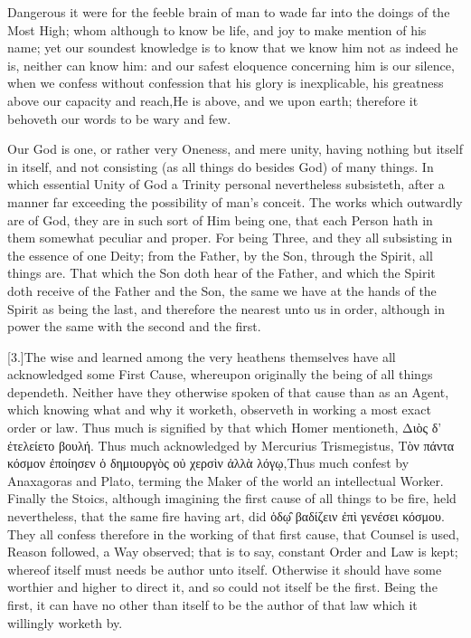 Dangerous it were for the feeble brain of man to wade far into the doings of the Most High; whom although to know be life, and joy to make mention of his name; yet our soundest knowledge is to know that we know him not as indeed he is, neither can know him: and our safest eloquence concerning him is our silence, when we confess without confession that his glory is inexplicable, his greatness above our capacity and reach,He is above, and we upon earth; therefore it behoveth our words to be wary and few.

Our God is one, or rather very Oneness, and mere unity, having nothing but itself in itself, and not consisting (as all things do besides God) of many things. In which essential Unity of God a Trinity personal nevertheless subsisteth, after a manner far exceeding the possibility of man’s conceit. The works which outwardly are of God, they are in such sort of Him being one, that each Person hath in them somewhat peculiar and proper. For being Three, and they all subsisting in the essence of one Deity; from the Father, by the Son, through the Spirit, all things are. That which the Son doth hear of the Father, and which the Spirit doth receive of the Father and the Son, the same we have at the hands of the Spirit as being the last, and therefore the nearest unto us in order, although in power the same with the second and the first.

[3.]The wise and learned among the very heathens themselves have all acknowledged some First Cause, whereupon originally the being of all things dependeth. Neither have they otherwise spoken of that cause than as an Agent, which knowing what and why it worketh, observeth in working a most exact order or law. Thus much is signified by that which Homer mentioneth, Διὸς δ’ ἐτελείετο βουλή. Thus  much acknowledged by Mercurius Trismegistus, Τὸν πάντα κόσμον ἐποίησεν ὁ δημιουργὸς οὐ χερσὶν ἀλλὰ λόγῳ,Thus much confest by Anaxagoras and Plato, terming the Maker of the world an intellectual Worker. Finally the Stoics, although imagining the first cause of all things to be fire, held nevertheless, that the same fire having art, did ὁδῳ̑ βαδίζειν ἐπὶ γενέσει κόσμου. They all confess therefore in the working of that first cause, that Counsel is used, Reason followed, a Way observed; that is to say, constant Order and Law is kept; whereof itself must needs be author unto itself. Otherwise it should have some worthier and higher to direct it, and so could not itself be the first. Being the first, it can have no other than itself to be the author of that law which it willingly worketh by.

